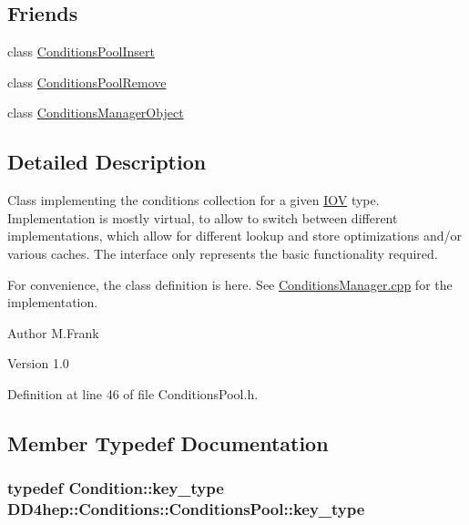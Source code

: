 \subsection*{Friends}
\begin{DoxyCompactItemize}
\item 
class \hyperlink{class_d_d4hep_1_1_conditions_1_1_conditions_pool_adc5b872586a9fed84b7604b98cb7bd58}{ConditionsPoolInsert}
\item 
class \hyperlink{class_d_d4hep_1_1_conditions_1_1_conditions_pool_a3b722c844edb9493ba7339da2813026b}{ConditionsPoolRemove}
\item 
class \hyperlink{class_d_d4hep_1_1_conditions_1_1_conditions_pool_a8bc615a0a23a8207d3e5399c5066763e}{ConditionsManagerObject}
\end{DoxyCompactItemize}


\subsection{Detailed Description}
Class implementing the conditions collection for a given \hyperlink{class_d_d4hep_1_1_i_o_v}{IOV} type. Implementation is mostly virtual, to allow to switch between different implementations, which allow for different lookup and store optimizations and/or various caches. The interface only represents the basic functionality required.

For convenience, the class definition is here. See \hyperlink{_conditions_manager_8cpp}{ConditionsManager.cpp} for the implementation.

\begin{DoxyAuthor}{Author}
M.Frank 
\end{DoxyAuthor}
\begin{DoxyVersion}{Version}
1.0 
\end{DoxyVersion}


Definition at line 46 of file ConditionsPool.h.

\subsection{Member Typedef Documentation}
\hypertarget{class_d_d4hep_1_1_conditions_1_1_conditions_pool_af0032de2b90b6bab00bf857f6078daaf}{
\subsubsection[{key\_\-type}]{\setlength{\rightskip}{0pt plus 5cm}typedef {\bf Condition::key\_\-type} {\bf DD4hep::Conditions::ConditionsPool::key\_\-type}}}
\label{class_d_d4hep_1_1_conditions_1_1_conditions_pool_af0032de2b90b6bab00bf857f6078daaf}


